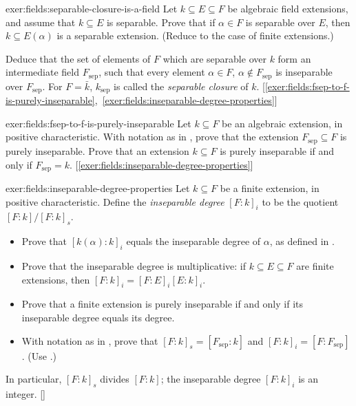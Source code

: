 \begin{exer}{}{exer:fields:separable-closure-is-a-field}
  Let $k \subseteq E \subseteq F$ be algebraic field extensions, and
  assume that $k \subseteq E$ is separable. Prove that if
  $\alpha \in F$ is separable over $E$, then $k \subseteq E(\alpha)$
  is a separable extension. (Reduce to the case of finite extensions.)

  Deduce that the set of elements of $F$ which are separable over $k$
  form an intermediate field $F_{\mathrm{sep}}$, such that every
  element $\alpha \in F$, $\alpha \notin F_{\mathrm{sep}}$ is
  inseparable over $F_{\mathrm{sep}}$. For $F = \bar{k}$,
  $k_{\mathrm{sep}}$ is called the \emph{separable closure} of $k$.\@
  [\ref{exer:fields:fsep-to-f-is-purely-inseparable},~\ref{exer:fields:inseparable-degree-properties}]
\end{exer}
\begin{exer}{}{exer:fields:fsep-to-f-is-purely-inseparable}
  Let $k \subseteq F$ be an algebraic extension, in positive
  characteristic.  With notation as in
  ,
  prove
  that the extension $F_{\mathrm{sep}} \subseteq F$ is purely
  inseparable. Prove that an extension $k \subseteq F$ is purely
  inseparable if and only if $F_{\mathrm{sep}} =
  k$. [\ref{exer:fields:inseparable-degree-properties}]
\end{exer}
\begin{exer}{}{exer:fields:inseparable-degree-properties}
  Let $k \subseteq F$ be a finite extension, in positive
  characteristic.  Define the \emph{inseparable degree} $[F : k]_i$ to
  be the quotient ${[F : k]} / {[F : k]}_s$.
  \begin{itemize}
  \item Prove that ${[k(\alpha) : k]}_i$ equals the inseparable degree
    of $\alpha$, as defined in
    .
  \item Prove that the inseparable degree is multiplicative: if
    $k \subseteq E \subseteq F$ are finite extensions, then
    $[F : k]_i = [F : E]_i [E : k]_i$.
  \item Prove that a finite extension is purely inseparable if and
    only if its inseparable degree equals its degree.
  \item With notation as in
    , prove that
    $[F : k]_s = [F_{\mathrm{sep}} : k]$ and
    $[F : k]_i = [F : F_{\mathrm{sep}}]$. (Use
    .)
  \end{itemize}
  In particular, $[F : k]_s$ divides $[F : k]$; the inseparable degree
  $[F : k]_i$ is an
  integer. []
\end{exer}
